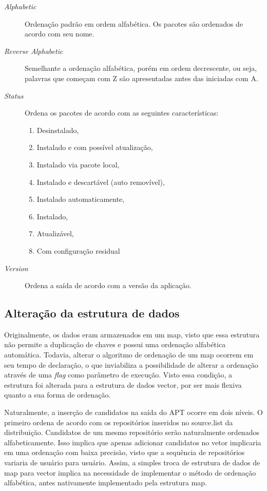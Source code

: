 \begin{description}
	\item [\textit{Alphabetic}] Ordenação padrão em ordem alfabética. Os pacotes são ordenados de acordo com seu nome.
	\item [\textit{Reverse Alphabetic}] Semelhante a ordenação alfabética, porém em ordem decrescente, ou seja, palavras que começam com {\code Z} são apresentadas antes das iniciadas com {\code A}.
	\item [\textit{Status}] Ordena os pacotes de acordo com as seguintes características:
	\begin{enumerate}
		\item Desinstalado,
		\item Instalado e com possível atualização,
		\item Instalado via pacote local,
		\item Instalado e descartável (auto removível),
		\item Instalado automaticamente,
		\item Instalado,
		\item Atualizável,
		\item Com configuração residual
	\end{enumerate}
	\item [\textit{Version}] Ordena a saída de acordo com a versão da aplicação.
\end{description}

\subsection*{Alteração da estrutura de dados} %
\label{sub:altera_o_da_estrutuda_de_dados}

Originalmente, os dados eram armazenados em um {\code map}, visto que essa estrutura não permite a duplicação de chaves e possui uma ordenação alfabética automática. Todavia, alterar o algoritmo de ordenação de um {\code map} ocorrem em seu tempo de declaração, o que  inviabiliza a possibilidade de alterar a ordenação através de uma \textit{flag} como parâmetro de execução. Visto essa condição, a estrutura foi alterada para a estrutura de dados {\code vector}, por ser mais flexiva quanto a sua forma de ordenação.

Naturalmente, a inserção de candidatos na saída do {\code APT} ocorre  em dois níveis. O primeiro ordena de acordo com os repositórios inseridos no {\code source.list} da distribuição. Candidatos de um mesmo repositório serão naturalmente ordenados alfabeticamente. Isso implica que apenas adicionar candidatos no vetor implicaria em uma ordenação com baixa precisão, visto que a sequência de repositórios variaria de usuário para usuário. Assim, a simples troca de estrutura de dados de {\code map} para {\code vector} implica na necessidade de implementar o método de ordenação alfabética, antes nativamente implementado pela estrutura {\code map}.

